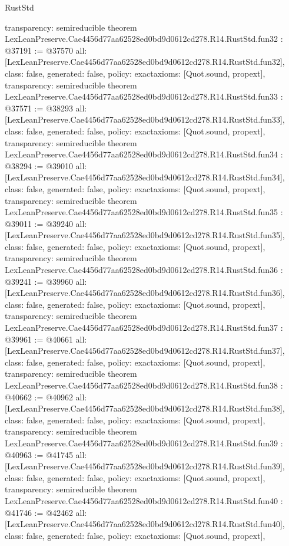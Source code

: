 \begin{lexlean}{RustStd}
\begin{coremodule}
{  transparency: semireducible
}
theorem LexLeanPreserve.Cae4456d77aa62528ed0bd9d0612cd278.R14.RustStd.fun32 : @37191 := @37570 {
  all: [LexLeanPreserve.Cae4456d77aa62528ed0bd9d0612cd278.R14.RustStd.fun32],
  class: false,
  generated: false,
  policy: exact{axioms: [Quot.sound, propext]},
  transparency: semireducible
}
theorem LexLeanPreserve.Cae4456d77aa62528ed0bd9d0612cd278.R14.RustStd.fun33 : @37571 := @38293 {
  all: [LexLeanPreserve.Cae4456d77aa62528ed0bd9d0612cd278.R14.RustStd.fun33],
  class: false,
  generated: false,
  policy: exact{axioms: [Quot.sound, propext]},
  transparency: semireducible
}
theorem LexLeanPreserve.Cae4456d77aa62528ed0bd9d0612cd278.R14.RustStd.fun34 : @38294 := @39010 {
  all: [LexLeanPreserve.Cae4456d77aa62528ed0bd9d0612cd278.R14.RustStd.fun34],
  class: false,
  generated: false,
  policy: exact{axioms: [Quot.sound, propext]},
  transparency: semireducible
}
theorem LexLeanPreserve.Cae4456d77aa62528ed0bd9d0612cd278.R14.RustStd.fun35 : @39011 := @39240 {
  all: [LexLeanPreserve.Cae4456d77aa62528ed0bd9d0612cd278.R14.RustStd.fun35],
  class: false,
  generated: false,
  policy: exact{axioms: [Quot.sound, propext]},
  transparency: semireducible
}
theorem LexLeanPreserve.Cae4456d77aa62528ed0bd9d0612cd278.R14.RustStd.fun36 : @39241 := @39960 {
  all: [LexLeanPreserve.Cae4456d77aa62528ed0bd9d0612cd278.R14.RustStd.fun36],
  class: false,
  generated: false,
  policy: exact{axioms: [Quot.sound, propext]},
  transparency: semireducible
}
theorem LexLeanPreserve.Cae4456d77aa62528ed0bd9d0612cd278.R14.RustStd.fun37 : @39961 := @40661 {
  all: [LexLeanPreserve.Cae4456d77aa62528ed0bd9d0612cd278.R14.RustStd.fun37],
  class: false,
  generated: false,
  policy: exact{axioms: [Quot.sound, propext]},
  transparency: semireducible
}
theorem LexLeanPreserve.Cae4456d77aa62528ed0bd9d0612cd278.R14.RustStd.fun38 : @40662 := @40962 {
  all: [LexLeanPreserve.Cae4456d77aa62528ed0bd9d0612cd278.R14.RustStd.fun38],
  class: false,
  generated: false,
  policy: exact{axioms: [Quot.sound, propext]},
  transparency: semireducible
}
theorem LexLeanPreserve.Cae4456d77aa62528ed0bd9d0612cd278.R14.RustStd.fun39 : @40963 := @41745 {
  all: [LexLeanPreserve.Cae4456d77aa62528ed0bd9d0612cd278.R14.RustStd.fun39],
  class: false,
  generated: false,
  policy: exact{axioms: [Quot.sound, propext]},
  transparency: semireducible
}
theorem LexLeanPreserve.Cae4456d77aa62528ed0bd9d0612cd278.R14.RustStd.fun40 : @41746 := @42462 {
  all: [LexLeanPreserve.Cae4456d77aa62528ed0bd9d0612cd278.R14.RustStd.fun40],
  class: false,
  generated: false,
  policy: exact{axioms: [Quot.sound, propext]},
}
\end{coremodule}
\end{lexlean}
